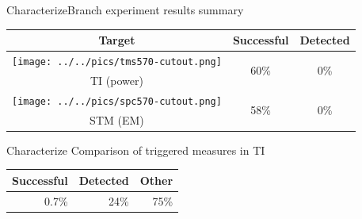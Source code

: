 \documentclass[table]{beamer}
\begin{document}
\begin{frame}{Characterize}{Branch experiment results summary}
    \begin{table}[H]
          \centering
          \begin{tabular}{c c c}
          \toprule
            \cellcolor{white!100} Target & Successful & Detected \\
            \midrule
            \texttt{[image: ../../pics/tms570-cutout.png]} & \multirow{ 2}{*}{60\%} & \multirow{ 2}{*}{0\%} \\ TI (power) & &\\
            \cmidrule{1-3}
            \texttt{[image: ../../pics/spc570-cutout.png]} & \multirow{ 2}{*}{58\%} & \multirow{ 2}{*}{0\%} \\ STM (EM) & &\\
          \bottomrule
          \end{tabular}
    \end{table}
    
\end{frame}

\begin{frame}{Characterize}{ Comparison of triggered measures in TI}
    
    \begin{table}[H]
          \centering
          \begin{tabular}{r r r}
          \toprule
            Successful & Detected & Other \\
            \midrule
            0.7\% & 24\% & 75\% \\
          \bottomrule
          \end{tabular}
    \end{table}

\end{frame}
\end{document}
